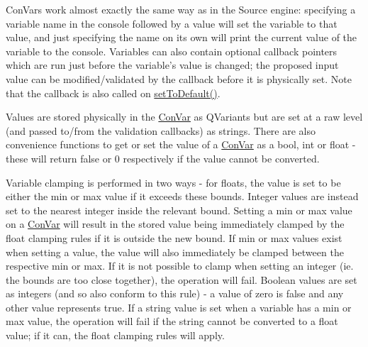 Con\-Vars work almost exactly the same way as in the Source engine\-: specifying a variable name in the console followed by a value will set the variable to that value, and just specifying the name on its own will print the current value of the variable to the console. Variables can also contain optional callback pointers which are run just before the variable's value is changed; the proposed input value can be modified/validated by the callback before it is physically set. Note that the callback is also called on \hyperlink{class_con_var_a64a961b8a329ae1da039d90e37902b69}{set\-To\-Default()}.\par
\par
 Values are stored physically in the \hyperlink{class_con_var}{Con\-Var} as Q\-Variants but are set at a raw level (and passed to/from the validation callbacks) as strings. There are also convenience functions to get or set the value of a \hyperlink{class_con_var}{Con\-Var} as a bool, int or float -\/ these will return false or 0 respectively if the value cannot be converted.\par
\par
 Variable clamping is performed in two ways -\/ for floats, the value is set to be either the min or max value if it exceeds these bounds. Integer values are instead set to the nearest integer inside the relevant bound. Setting a min or max value on a \hyperlink{class_con_var}{Con\-Var} will result in the stored value being immediately clamped by the float clamping rules if it is outside the new bound. If min or max values exist when setting a value, the value will also immediately be clamped between the respective min or max. If it is not possible to clamp when setting an integer (ie. the bounds are too close together), the operation will fail. Boolean values are set as integers (and so also conform to this rule) -\/ a value of zero is false and any other value represents true. If a string value is set when a variable has a min or max value, the operation will fail if the string cannot be converted to a float value; if it can, the float clamping rules will apply. 

